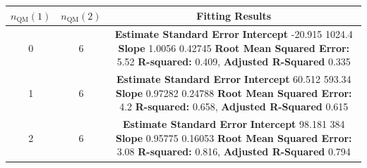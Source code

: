 \begin{table}
  \centering
  \caption{Fitting results for correlation of QM/MM harmonic frequencies of \num{10} MD snapshots, with increasing numbers of anion-cation pairs (\(n_{\text{QM}}\)) treated quantum mechanically.}
  \label{paper_02:tab:S6}
  \begin{longtable}[]{@{}ccc@{}}
    \toprule
    \(n_{\text{QM}}(1)\) & \(n_{\text{QM}}(2)\) & Fitting Results\tabularnewline
    \midrule
    \endhead
    \begin{minipage}[t]{0.32\columnwidth}\raggedright
      0\strut
    \end{minipage} & \begin{minipage}[t]{0.32\columnwidth}\raggedright
      6\strut
    \end{minipage} & \begin{minipage}[t]{0.32\columnwidth}\raggedright
      \textbf{Estimate Standard Error}
      \textbf{Intercept} -20.915 1024.4
      \textbf{Slope} 1.0056 0.42745
      \textbf{Root Mean Squared Error:} 5.52
      \textbf{R-squared:} 0.409, \textbf{Adjusted R-Squared} 0.335\strut
    \end{minipage}\tabularnewline
    \begin{minipage}[t]{0.32\columnwidth}\raggedright
      1\strut
    \end{minipage} & \begin{minipage}[t]{0.32\columnwidth}\raggedright
      6\strut
    \end{minipage} & \begin{minipage}[t]{0.32\columnwidth}\raggedright
      \textbf{Estimate Standard Error}
      \textbf{Intercept} 60.512 593.34
      \textbf{Slope} 0.97282 0.24788
      \textbf{Root Mean Squared Error:} 4.2
      \textbf{R-squared:} 0.658, \textbf{Adjusted R-Squared} 0.615\strut
    \end{minipage}\tabularnewline
    \begin{minipage}[t]{0.32\columnwidth}\raggedright
      2\strut
    \end{minipage} & \begin{minipage}[t]{0.32\columnwidth}\raggedright
      6\strut
    \end{minipage} & \begin{minipage}[t]{0.32\columnwidth}\raggedright
      \textbf{Estimate Standard Error}
      \textbf{Intercept} 98.181 384
      \textbf{Slope} 0.95775 0.16053
      \textbf{Root Mean Squared Error:} 3.08
      \textbf{R-squared:} 0.816, \textbf{Adjusted R-Squared} 0.794\strut
    \end{minipage}\tabularnewline

\end{longtable}
\end{table}
